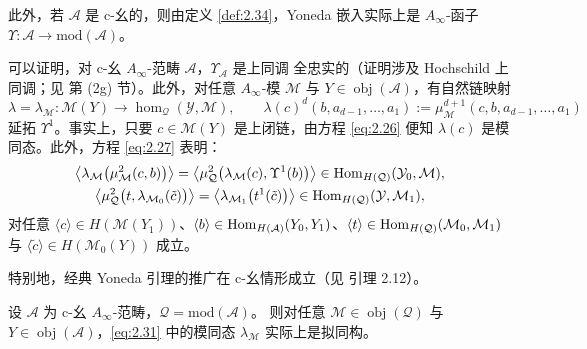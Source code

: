 此外，若 $\mathcal A$ 是 c-幺的，则由定义 \ref{def:2.34}，Yoneda 嵌入实际上是
$A_\infty$-函子 $\Upsilon:\mathcal A\to\mathrm{mod}(\mathcal A)$。

可以证明，对 c-幺 $A_\infty$-范畴 $\mathcal A$，$\Upsilon_{\mathcal A}$ 是上同调
全忠实的（证明涉及 Hochschild 上同调；见 \cite{Sei08} 第 (2g) 节）。此外，对任意
$A_\infty$-模 $\mathcal M$ 与 $Y\in\operatorname{obj}(\mathcal A)$，有自然链映射
\begin{equation}\label{eq:2.31}
  \lambda=\lambda_{\mathcal M}:\mathcal M(Y)\to\hom_{\mathcal Q}(\mathcal Y,
  \mathcal M),\qquad
  \lambda(c)^d(b,a_{d-1},\dots,a_1):=\mu^{d+1}_{\mathcal M}(c,b,a_{d-1},\dots,a_1)
\end{equation}
延拓 $\Upsilon^1$。事实上，只要 $c\in\mathcal M(Y)$ 是上闭链，由方程
\eqref{eq:2.26} 便知 $\lambda(c)$ 是模同态。此外，方程 \eqref{eq:2.27} 表明：
\begin{equation}\label{eq:2.32}
  \begin{gathered}
    \bigl\langle\lambda_{\mathcal M}\bigl(\mu^2_{\mathcal M}(c,b)\bigr)\bigr\rangle
    =\bigl\langle\mu^2_{\mathcal Q}\bigl(\lambda_{\mathcal M}(c),\Upsilon^1(b)
    \bigr)\bigr\rangle\in\operatorname{Hom}_{H(\mathcal Q)}(\mathcal Y_0,\mathcal M),\\
    \bigl\langle\mu^2_{\mathcal Q}\bigl(t,\lambda_{\mathcal M_0}(\tilde c)\bigr)
    \bigr\rangle=\bigl\langle\lambda_{\mathcal M_1}\bigl(t^1(\tilde c)\bigr)
    \bigr\rangle\in\operatorname{Hom}_{H(\mathcal Q)}(\mathcal Y,\mathcal M_1),
  \end{gathered}
\end{equation}
对任意 $\langle c\rangle\in H(\mathcal M(Y_1))$、$\langle b\rangle\in
\operatorname{Hom}_{H(\mathcal A)}(Y_0,Y_1)$、$\langle t\rangle\in\operatorname{Hom}_{H(\mathcal Q)}
(\mathcal M_0,\mathcal M_1)$ 与 $\langle\tilde c\rangle\in H(\mathcal M_0(Y))$ 成立。

特别地，经典 Yoneda 引理的推广在 c-幺情形成立（见 \cite{Sei08} 引理 2.12）。

\begin{Lem}[Yoneda 引理]\label{lem:2.36}
设 $\mathcal A$ 为 c-幺 $A_\infty$-范畴，$\mathcal Q=\mathrm{mod}(\mathcal A)$。
则对任意 $\mathcal M\in\operatorname{obj}(\mathcal Q)$ 与 $Y\in\operatorname{obj}
(\mathcal A)$，\eqref{eq:2.31} 中的模同态 $\lambda_{\mathcal M}$ 实际上是拟同构。
\end{Lem}

